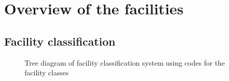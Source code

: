 %
\chapter{Overview of the facilities}


\section{Facility classification}



\begin{figure}
    \centering
    
    \caption{Tree diagram of facility classification system using codes for the
    facility classes}
\end{figure}
